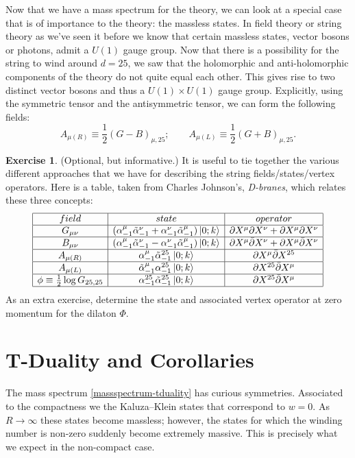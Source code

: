 \documentclass{report}
\theoremstyle{plain}
\theoremstyle{definition}
\newtheorem{exercise}{Exercise}[section]
\theoremstyle{remark}
\newcommand{\FR}[2]{\frac{#1}{#2}}
\newcommand{\di}{\partial}
\begin{document}
Now that we have a mass spectrum for the theory, we can look at a
special case that is of importance to the theory: the massless states.
In field theory or string theory as we've seen it before we know that
certain massless states, vector bosons or photons, admit a $U(1)$
gauge group. 
Now that there is a possibility for the string to wind around
$d=25$, we saw that the holomorphic and anti-holomorphic components of the
theory do not quite equal each other. This gives rise to two distinct
vector bosons and thus a $U(1)\times U(1)$ gauge group. Explicitly, using
the symmetric tensor and the antisymmetric tensor, we can form the
following fields:
\[ A_{\mu(R)} \equiv \FR{1}{2}(G-B)_{\mu,25};\qquad
A_{\mu(L)} \equiv \FR{1}{2}(G+B)_{\mu,25}.\]
\begin{exercise}(Optional, but informative.) It is useful to tie together
    the various different approaches that we have for describing the
    string fields/states/vertex operators. Here is a table, taken from
    Charles Johnson's, \emph{D-branes}, which relates these three concepts:
    \begin{align*}
    \begin{array}{|c|c|c|}
        \hline
        field & state & operator\\
        \hline
G_{\mu\nu} & (\alpha^\mu_{-1}\tilde\alpha^\nu_{-1} + \alpha^\nu_{-1}\tilde\alpha^\mu_{-1})\ket{0;k} & \di X^\mu\di X^\nu + \di X^\mu\di X^\nu\\
        \hline
B_{\mu\nu} & (\alpha^\mu_{-1}\tilde\alpha^\nu_{-1} - \alpha^\nu_{-1}\tilde\alpha^\mu_{-1})\ket{0;k} & \di X^\mu\bar\di X^\nu + \di X^\mu\bar\di X^\nu\\
        \hline
A_{\mu(R)} & \alpha^{\mu}_{-1}\tilde\alpha^{25}_{-1}\ket{0;k} & \di X^\mu\bar\di X^{25}\\
        \hline
A_{\mu(L)} & \tilde\alpha^{\mu}_{-1}\alpha^{25}_{-1}\ket{0;k} & \di X^{25}\bar\di X^\mu\\
        \hline
\phi \equiv \FR{1}{2}\log G_{25,25} &
\alpha^{25}_{-1}\tilde\alpha^{25}_{-1}\ket{0;k} & \di X^{25}\bar\di
X^\mu\\
    \hline
    \end{array}
    \end{align*}
    As an extra exercise, determine the state and associated vertex
    operator at zero momentum for the dilaton $\Phi$.
\end{exercise}

\section{T-Duality and Corollaries}
The mass spectrum \eqref{massspectrum-tduality} has curious symmetries.
Associated to the compactness we the Kaluza--Klein states that correspond to
$w=0$. As $R\to\infty$ these states become massless; however, the states
for which the winding number is non-zero suddenly become extremely massive.
This is precisely what we expect in the non-compact case. 
\end{document}
